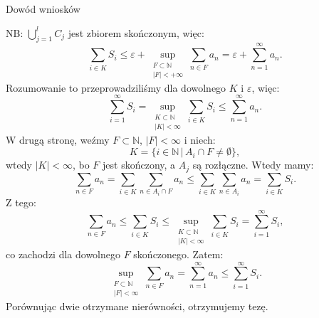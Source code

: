 \documentclass{article}
\numberwithin{defi}{section}
\numberwithin{theo}{section}
\numberwithin{defi}{section}
\newcommand{\N}{\mathbb{N}}
\newcommand{\oo}{\infty}
\begin{document}
\begin{dow}{Dowód wniosków}
\begin{enumerate}
              NB: $\bigcup_{j=1}^l C_j$ jest zbiorem skończonym, więc:
              \[\sum_{i \in K} S_i \leqslant \varepsilon + \sup_{\substack{F\subset \N \\ |F| <  +\oo}} \sum_{n \in F} a_n = \varepsilon + \sum_{n=1}^{\oo} a_n.\]
              Rozumowanie to przeprowadziliśmy dla dowolnego $K$ i $\varepsilon$, więc:
              \[\sum_{i=1}^{\oo} S_i = \sup_{\substack{K \subset \N \\ |K| < \oo}} \sum_{i \in K} S_i \leqslant \sum_{n=1}^{\oo} a_n.\]
              W drugą stronę, weźmy $F \subset \N$, $|F| < \oo$ i niech:
              \[K = \{ i \in \N \, |\, A_i \cap F \neq \emptyset \},\]
              wtedy $|K| < \oo$, bo $F$ jest skończony, a $A_j$ są rozłączne. Wtedy mamy:
              \[\sum_{n\in F} a_n = \sum_{i\in K} \sum_{n \in A_i \cap F} a_n \leqslant \sum_{i \in K} \sum_{n \in A_i} a_n = \sum_{i \in K} S_i.\]
              Z tego:
              \[\sum_{n \in F} a_n \leqslant \sum_{i \in K} S_i \leqslant \sup_{\substack{K \subset \N \\ |K| < \oo}} \sum_{i \in K} S_i = \sum_{i =1}^{\oo} S_i, \]
              co zachodzi dla dowolnego $F$ skończonego. Zatem:
              \[\sup_{\substack{F \subset \N \\ |F| < \oo}}\sum_{n \in F} a_n = \sum_{n=1}^{\oo}a_n \leqslant \sum_{i =1}^{\oo} S_i.\]
              Porównując dwie otrzymane nierówności, otrzymujemy tezę.
    \end{enumerate}
\end{dow}
\end{document}
